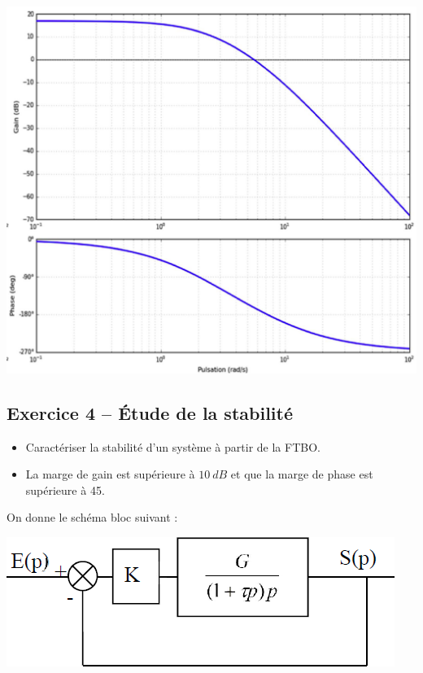 \documentclass[10pt,fleqn]{article} %
\begin{document}
\begin{multicols}{2}
\begin{center}
\includegraphics[width=\linewidth]{images/OLD/fig_05}
\end{center}




\subsection*{Exercice 4 -- Étude de la stabilité}





\ifprof
\else

\begin{obj}
\begin{itemize}
\item Caractériser la stabilité d'un système à partir de la FTBO.
\item La marge de gain est supérieure à $\SI{10}{dB}$ et que la marge de phase est supérieure à \SI{45}{\degres}.
\end{itemize}

\end{obj}


On donne le schéma bloc suivant :

\begin{center}
\includegraphics[width=.6\linewidth]{images/fig_02}
\end{center}


\end{multicols}
\end{document}
